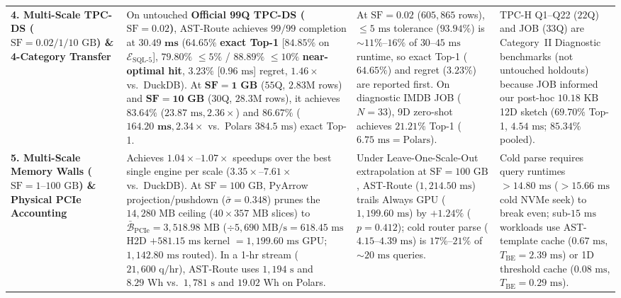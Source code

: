 \documentclass[10pt,a4paper]{article}
\newenvironment{fitasttable}{%
  \begin{lrbox}{\asttblbox}%
}{%
  \end{lrbox}%
  \sbox{\asttblboxB}{%
    \ifdim\wd\asttblbox>0.96\textwidth
      \resizebox{0.96\textwidth}{!}{\usebox{\asttblbox}}%
    \else
      \usebox{\asttblbox}%
    \fi
  }%
  \ifdim\ht\asttblboxB>0.72\textheight
    \resizebox{!}{0.72\textheight}{\usebox{\asttblboxB}}%
  \else
    \usebox{\asttblboxB}%
  \fi
}
\begin{document}
\begin{table}[!htbp]
{\begin{fitasttable}
\begin{tabular}{@{}p{2.6cm}p{4.6cm}p{4.3cm}p{4.5cm}@{}}
\textbf{4. Multi-Scale TPC-DS ($\text{SF}=0.02 / 1 / 10\text{ GB}$) \& 4-Category Transfer} & On untouched \textbf{Official 99Q TPC-DS ($\text{SF}=0.02$)}, AST-Route achieves $99/99$ completion at $\mathbf{30.49\text{ ms}}$ ($\mathbf{64.65\%}$ \textbf{exact Top-1} [$\mathbf{84.85\%}$ on $\mathcal{E}_{\text{SQL-5}}$], $\mathbf{79.80\%}$ $\le 5\%$ / $\mathbf{88.89\%}$ $\le 10\%$ \textbf{near-optimal hit}, $\mathbf{3.23\%}$ [$0.96\text{ ms}$] regret, $1.46\times$ vs.\ DuckDB). At $\mathbf{\text{SF}=1\text{ GB}}$ ($55$Q, $2.83\text{M}$ rows) and $\mathbf{\text{SF}=10\text{ GB}}$ ($30$Q, $28.3\text{M}$ rows), it achieves $\mathbf{83.64\%}$ ($23.87\text{ ms}, 2.36\times$) and $\mathbf{86.67\%}$ ($\mathbf{164.20\text{ ms}}, \mathbf{2.34\times}$ vs.\ Polars $384.5\text{ ms}$) exact Top-1. & At $\text{SF}=0.02$ ($605{,}865$ rows), $\le 5\text{ ms}$ tolerance ($93.94\%$) is $\sim 11\%\text{--}16\%$ of $30\text{--}45\text{ ms}$ runtime, so exact Top-1 ($64.65\%$) and regret ($3.23\%$) are reported first. On diagnostic IMDB JOB ($N=33$), 9D zero-shot achieves $\mathbf{21.21\%}$ Top-1 ($6.75\text{ ms} = \text{Polars}$). & TPC-H Q1--Q22 ($22$Q) and JOB ($33$Q) are Category~II Diagnostic benchmarks (not untouched holdouts) because JOB informed our post-hoc $10.18\text{ KB}$ 12D sketch ($69.70\%$ Top-1, $4.54\text{ ms}$; $85.34\%$ pooled). \\
\textbf{5. Multi-Scale Memory Walls ($\text{SF}=1\text{--}100\text{ GB}$) \& Physical PCIe Accounting} & Achieves $1.04\times\text{--}1.07\times$ speedups over the best single engine per scale ($3.35\times\text{--}7.61\times$ vs.\ DuckDB). At $\text{SF}=100\text{ GB}$, PyArrow projection/pushdown ($\bar{\sigma}=0.348$) prunes the $14{,}280\text{ MB}$ ceiling ($40\times 357\text{ MB}$ slices) to $\bar{\mathcal{B}}_{\text{PCIe}}=3{,}518.98\text{ MB}$ ($\div 5{,}690\text{ MB/s}=618.45\text{ ms}$ H2D $+581.15\text{ ms}$ kernel $=1{,}199.60\text{ ms}$ GPU; $1{,}142.80\text{ ms}$ routed). In a 1-hr stream ($21{,}600\text{ q/hr}$), AST-Route uses $1{,}194\text{ s}$ and $8.29\text{ Wh}$ vs.\ $1{,}781\text{ s}$ and $19.02\text{ Wh}$ on Polars. & Under Leave-One-Scale-Out extrapolation at $\text{SF}=100\text{ GB}$, AST-Route ($1{,}214.50\text{ ms}$) trails Always GPU ($1{,}199.60\text{ ms}$) by $+1.24\%$ ($p=0.412$); cold router parse ($4.15\text{--}4.39\text{ ms}$) is $17\%\text{--}21\%$ of $\sim 20\text{ ms}$ queries. & Cold parse requires query runtimes $>14.80\text{ ms}$ ($>15.66\text{ ms}$ cold NVMe seek) to break even; sub-$15\text{ ms}$ workloads use AST-template cache ($0.67\text{ ms}$, $T_{\text{BE}}=2.39\text{ ms}$) or 1D threshold cache ($0.08\text{ ms}$, $T_{\text{BE}}=0.29\text{ ms}$). \\

\end{tabular}
\end{fitasttable}}
\end{table}
\end{document}
